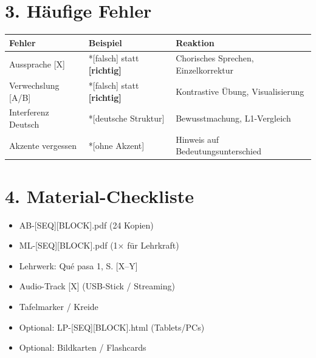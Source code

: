 \documentclass[11pt, a4paper]{article}
\newcommand{\fachfarbe}{spanisch}
\newcommand{\sequenz}{[SEQ]}
\newcommand{\block}{[BLOCK]}
\newcommand{\lerngruppengroesse}{24}
\newcommand{\es}[1]{\textcolor{\fachfarbe}{\textbf{#1}}}
\begin{document}
\section*{3. Häufige Fehler}

\begin{fehlerbox}
\begin{tabularx}{\textwidth}{|l|X|X|}
\hline
\textbf{Fehler} & \textbf{Beispiel} & \textbf{Reaktion} \\
\hline
Aussprache [X] & *[falsch] statt \es{[richtig]} & Chorisches Sprechen, Einzelkorrektur \\
\hline
Verwechslung [A/B] & *[falsch] statt \es{[richtig]} & Kontrastive Übung, Visualisierung \\
\hline
Interferenz Deutsch & *[deutsche Struktur] & Bewusstmachung, L1-Vergleich \\
\hline
Akzente vergessen & *[ohne Akzent] & Hinweis auf Bedeutungsunterschied \\
\hline
\end{tabularx}
\end{fehlerbox}


\section*{4. Material-Checkliste}

\begin{materialbox}
\begin{itemize}[label=$\square$]
    \item AB-\sequenz\block.pdf (\lerngruppengroesse{} Kopien)
    \item ML-\sequenz\block.pdf (1× für Lehrkraft)
    \item Lehrwerk: Qué pasa 1, S. [X--Y]
    \item Audio-Track [X] (USB-Stick / Streaming)
    \item Tafelmarker / Kreide
    \item Optional: LP-\sequenz\block.html (Tablets/PCs)
    \item Optional: Bildkarten / Flashcards
\end{itemize}
\end{materialbox}

\end{document}
